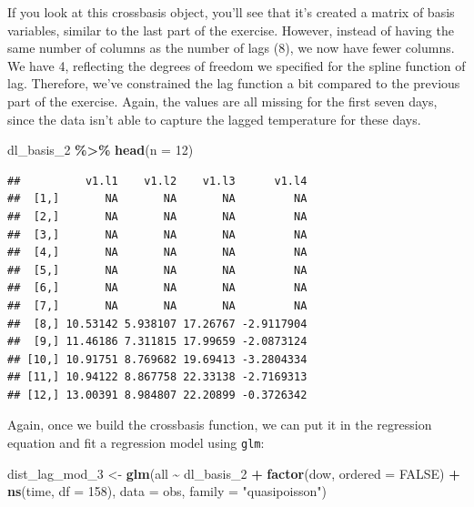 \documentclass[
]{book}
\newenvironment{Shaded}{\begin{snugshade}}{\end{snugshade}}
\newcommand{\AttributeTok}[1]{\textcolor[rgb]{0.13,0.29,0.53}{#1}}
\newcommand{\ConstantTok}[1]{\textcolor[rgb]{0.56,0.35,0.01}{#1}}
\newcommand{\DecValTok}[1]{\textcolor[rgb]{0.00,0.00,0.81}{#1}}
\newcommand{\FunctionTok}[1]{\textcolor[rgb]{0.13,0.29,0.53}{\textbf{#1}}}
\newcommand{\NormalTok}[1]{#1}
\newcommand{\OtherTok}[1]{\textcolor[rgb]{0.56,0.35,0.01}{#1}}
\newcommand{\SpecialCharTok}[1]{\textcolor[rgb]{0.81,0.36,0.00}{\textbf{#1}}}
\newcommand{\StringTok}[1]{\textcolor[rgb]{0.31,0.60,0.02}{#1}}
\begin{document}
If you look at this crossbasis object, you'll see that it's created a matrix of basis
variables, similar to the last part of the exercise. However, instead of having the same
number of columns as the number of lags (8), we now have fewer columns. We have 4, reflecting
the degrees of freedom we specified for the spline function of lag. Therefore, we've
constrained the lag function a bit compared to the previous part of the exercise. Again,
the values are all missing for the first seven days, since the data isn't able to capture
the lagged temperature for these days.

\begin{Shaded}
\begin{Highlighting}[]
\NormalTok{dl\_basis\_2 }\SpecialCharTok{\%\textgreater{}\%} 
  \FunctionTok{head}\NormalTok{(}\AttributeTok{n =} \DecValTok{12}\NormalTok{)}
\end{Highlighting}
\end{Shaded}

\begin{verbatim}
##          v1.l1    v1.l2    v1.l3      v1.l4
##  [1,]       NA       NA       NA         NA
##  [2,]       NA       NA       NA         NA
##  [3,]       NA       NA       NA         NA
##  [4,]       NA       NA       NA         NA
##  [5,]       NA       NA       NA         NA
##  [6,]       NA       NA       NA         NA
##  [7,]       NA       NA       NA         NA
##  [8,] 10.53142 5.938107 17.26767 -2.9117904
##  [9,] 11.46186 7.311815 17.99659 -2.0873124
## [10,] 10.91751 8.769682 19.69413 -3.2804334
## [11,] 10.94122 8.867758 22.33138 -2.7169313
## [12,] 13.00391 8.984807 22.20899 -0.3726342
\end{verbatim}

Again, once we build the crossbasis function, we can put it in the regression equation and
fit a regression model using \texttt{glm}:

\begin{Shaded}
\begin{Highlighting}[]
\NormalTok{dist\_lag\_mod\_3 }\OtherTok{\textless{}{-}} \FunctionTok{glm}\NormalTok{(all }\SpecialCharTok{\textasciitilde{}}\NormalTok{ dl\_basis\_2 }\SpecialCharTok{+} 
                        \FunctionTok{factor}\NormalTok{(dow, }\AttributeTok{ordered =} \ConstantTok{FALSE}\NormalTok{) }\SpecialCharTok{+}
                          \FunctionTok{ns}\NormalTok{(time, }\AttributeTok{df =} \DecValTok{158}\NormalTok{), }
                        \AttributeTok{data =}\NormalTok{ obs, }\AttributeTok{family =} \StringTok{"quasipoisson"}\NormalTok{)}
\end{Highlighting}
\end{Shaded}
\end{document}
